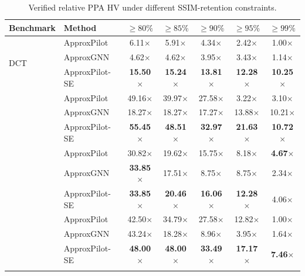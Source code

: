 \begin{table}[t]
\centering
\caption{Verified relative PPA HV under different SSIM-retention constraints.}
\label{tab:hv_gain}
\small
\setlength{\tabcolsep}{4pt}
\renewcommand{\arraystretch}{1.10}
\begin{tabular*}{\textwidth}
{@{\extracolsep{\fill}}llccccc@{}}
\toprule
Benchmark & Method
& $\geq80\%$
& $\geq85\%$
& $\geq90\%$
& $\geq95\%$
& $\geq99\%$ \\
\midrule

\multirow{3}{*}{DCT}
& ApproxPilot
& 6.11$\times$ & 5.91$\times$ & 4.34$\times$
& 2.42$\times$ & 1.00$\times$ \\
& ApproxGNN
& 4.62$\times$ & 4.62$\times$ & 3.95$\times$
& 3.43$\times$ & 1.14$\times$ \\
& ApproxPilot-SE
& \textbf{15.50$\times$} & \textbf{15.24$\times$}
& \textbf{13.81$\times$} & \textbf{12.28$\times$}
& \textbf{10.25$\times$} \\
\addlinespace[3pt]

\multirow{3}{*}{Laplace}
& ApproxPilot
& 49.16$\times$ & 39.97$\times$ & 27.58$\times$
& 3.22$\times$ & 3.10$\times$ \\
& ApproxGNN
& 18.27$\times$ & 18.27$\times$ & 17.27$\times$
& 13.88$\times$ & 10.21$\times$ \\
& ApproxPilot-SE
& \textbf{55.45$\times$} & \textbf{48.51$\times$}
& \textbf{32.97$\times$} & \textbf{21.63$\times$}
& \textbf{10.72$\times$} \\
\addlinespace[3pt]

\multirow{3}{*}{Sobel}
& ApproxPilot
& 30.82$\times$ & 19.62$\times$ & 15.75$\times$
& 8.18$\times$ & \textbf{4.67$\times$} \\
& ApproxGNN
& \textbf{33.85$\times$} & 17.51$\times$ & 8.75$\times$
& 8.75$\times$ & 2.34$\times$ \\
& ApproxPilot-SE
& \textbf{33.85$\times$} & \textbf{20.46$\times$}
& \textbf{16.06$\times$} & \textbf{12.28$\times$}
& 4.06$\times$ \\
\addlinespace[3pt]

\multirow{3}{*}{Gaussian}
& ApproxPilot
& 42.50$\times$ & 34.79$\times$ & 27.58$\times$
& 12.82$\times$ & 1.00$\times$ \\
& ApproxGNN
& 43.24$\times$ & 18.28$\times$ & 8.96$\times$
& 3.95$\times$ & 1.64$\times$ \\
& ApproxPilot-SE
& \textbf{48.00$\times$} & \textbf{48.00$\times$}
& \textbf{33.49$\times$} & \textbf{17.17$\times$}
& \textbf{7.46$\times$} \\
\addlinespace[3pt]


\end{tabular*}
\end{table}
